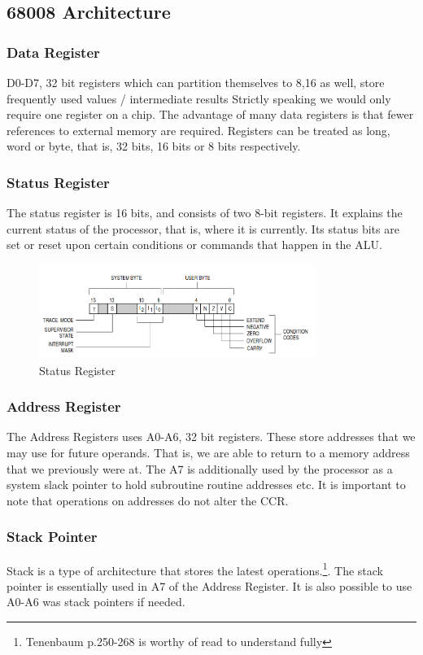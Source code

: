 \documentclass[a4paper]{article}
\theoremstyle{plain}
\theoremstyle{definition}
\theoremstyle{remark}
\begin{document}
\subsection{68008 Architecture}
\subsubsection{Data Register}
D0-D7, 32 bit registers which can partition themselves to 8,16 as well, store frequently used values / intermediate results
Strictly speaking we would only require one register on a chip. The advantage of many data registers is that fewer references to external memory are required. Registers can be treated as long, word or byte, that is, 32 bits, 16 bits or 8 bits respectively.
\subsubsection{Status Register}
The status register is 16 bits, and consists of two 8-bit registers. It explains the current status of the processor, that is, where it is currently.
Its status bits are set or reset upon certain conditions or commands that happen in the ALU.
\begin{figure}[H]
	\centering
	\includegraphics[width=0.8\textwidth]{figures/statr.png}
	\caption{Status Register}
	\label{fig:figures-statr-png}
\end{figure}	
\subsubsection{Address Register}
The Address Registers uses A0-A6, 32 bit registers. These store addresses that we may use for future operands. That is, we are able to return to a memory address that we previously were at. The A7 is additionally used by the processor as a system slack pointer to hold subroutine routine addresses etc. It is important to note that operations on addresses do not alter the CCR.
\subsubsection{Stack Pointer}
Stack is a type of architecture that stores the latest operations.\footnote{Tenenbaum p.250-268 is worthy of read to understand fully}. The stack pointer is essentially used in A7 of the Address Register. It is also possible to use A0-A6 was stack pointers if needed.
\end{document}

